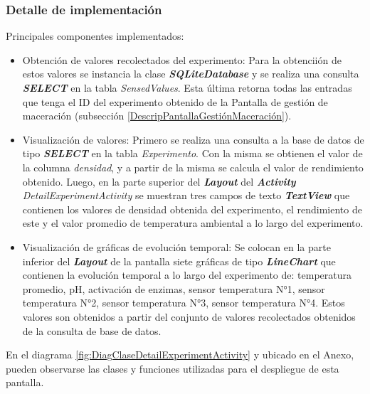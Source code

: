             \subsubsection{Detalle de implementación}
            \par Principales componentes implementados:
            \begin{itemize}
                \item Obtención de valores recolectados del experimento: Para la obtenciión de estos valores se instancia la clase \textbf{\textit{\gls{SQLiteDatabase}}} y se realiza una consulta \textbf{\textit{\gls{SELECT}}} en la tabla \textit{SensedValues}. Esta última retorna todas las entradas que tenga el ID del experimento obtenido de la Pantalla de gestión de maceración (subsección \ref{DescripPantallaGestiónMaceración}).
                
                \item Visualización de valores: Primero se realiza una consulta a la base de datos de tipo \textbf{\textit{\gls{SELECT}}} en la tabla \textit{Experimento}. Con la misma se obtienen el valor de la columna \textit{densidad}, y a partir de la misma se calcula el valor de rendimiento obtenido. Luego, en la parte superior del \textbf{\textit{\gls{Layout}}} del \textbf{\textit{\gls{Activity}}} \textit{DetailExperimentActivity} se muestran tres campos de texto \textbf{\textit{\gls{TextView}}} que contienen los valores de densidad obtenida del experimento, el rendimiento de este y el valor promedio de temperatura ambiental a lo largo del experimento.
                
                \item Visualización de gráficas de evolución temporal: Se colocan en la parte inferior del \textbf{\textit{\gls{Layout}}} de la pantalla siete gráficas de tipo \textbf{\textit{\gls{LineChart}}} que contienen la evolución temporal a lo largo del experimento de: temperatura promedio, pH, activación de enzimas, sensor temperatura N°1, sensor temperatura N°2, sensor temperatura N°3, sensor temperatura N°4. Estos valores son obtenidos a partir del conjunto de valores recolectados obtenidos de la consulta de base de datos.
            \end{itemize}
            
            \par En el diagrama \ref{fig:DiagClaseDetailExperimentActivity} y ubicado en el Anexo, pueden observarse las clases y funciones utilizadas para el despliegue de esta pantalla.
            
